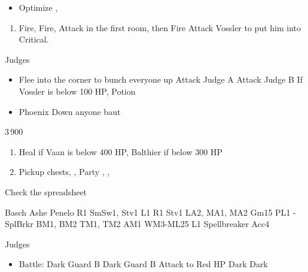 \begin{equip}
	\begin{itemize}
		\item Optimize \basch, \vaan
	\end{itemize}
\end{equip}
\begin{enumerate}
	\item Fire, Fire, Attack in the first room, then Fire Attack Vossler to put him into Critical.
\end{enumerate}
\begin{battle}{Judges}
	\begin{itemize}
		\item Flee into the corner to bunch everyone up
		      \vaanf Attack Judge A
		      \baschf Attack Judge B
		      \balthierf If Vossler is below 100 HP, Potion
		\item Phoenix Down anyone baut \balthier
	\end{itemize}
\end{battle}
\begin{shop}{3\,900}
\end{shop}
\begin{enumerate}
	\item Heal if Vaan is below 400 HP, Balthier if below 300 HP
	\item Pickup chests, \leader{\vaan}, Party \vaan, \penelo, \ashe
\end{enumerate}
\begin{liscense}
	Check the spreadsheet

	Basch	Ashe	Penelo
	R1	SmSw1, Stv1	L1
	R1	Stv1
	LA2, MA1, MA2
	Gm15
	PL1 - SplBrkr
	BM1, BM2
	TM1, TM2
	AM1
	WM3-ML25	L1
	Spellbreaker
	Acc4
\end{liscense}
\begin{battle}{Judges}
	\begin{itemize}
		\vaanf Reflect \ashe
		\ashef Heal \vaan
		\penelof Reflect \penelo
		\vaanf Reflect \vaan
		\item Battle:
		      \vaanf Dark Guard B
		      \penelof Dark Guard B
		      \ashef Attack \penelo to Red HP
		      \vaanf Dark \penelo
		      \penelof Dark \penelo
	\end{itemize}
\end{battle}